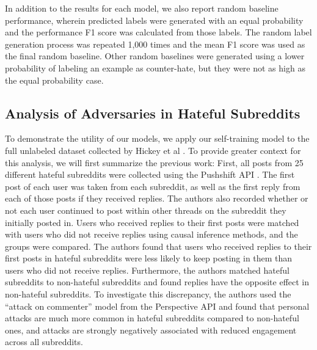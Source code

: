 \documentclass[10pt,twocolumn,letterpaper]{article}
\begin{document}
In addition to the results for each model, we also report random baseline performance, wherein predicted labels were generated with an equal probability and the performance F1 score was calculated from those labels. The random label generation process was repeated 1,000 times and the mean F1 score was used as the final random baseline. Other random baselines were generated using a lower probability of labeling an example as counter-hate, but they were not as high as the equal probability case.

\subsection{Analysis of Adversaries in Hateful Subreddits}

To demonstrate the utility of our models, we apply our self-training model to the full unlabeled dataset collected by Hickey et al \cite{hickey2023reddit}. To provide greater context for this analysis, we will first summarize the previous work: First, all posts from 25 different hateful subreddits were collected using the Pushshift API \cite{baumgartner2020pushshift}. The first post of each user was taken from each subreddit, as well as the first reply from each of those posts if they received replies. The authors also recorded whether or not each user continued to post within other threads on the subreddit they initially posted in. Users who received replies to their first posts were matched with users who did not receive replies using causal inference methods, and the groups were compared. The authors found that users who received replies to their first posts in hateful subreddits were less likely to keep posting in them than users who did not receive replies. Furthermore, the authors matched hateful subreddits to non-hateful subreddits and found replies have the opposite effect in non-hateful subreddits. To investigate this discrepancy, the authors used the ``attack on commenter'' model from the Perspective API \cite{Jigsaw2017} and found that personal attacks are much more common in hateful subreddits compared to non-hateful ones, and attacks are strongly negatively associated with reduced engagement across all subreddits.

\end{document}
